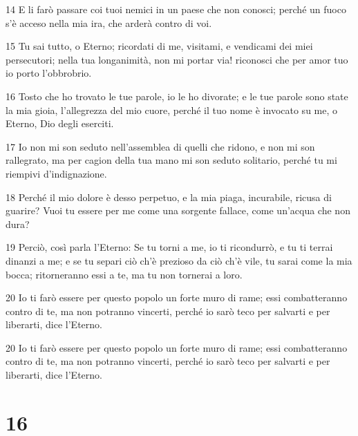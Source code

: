 \par 14 E li farò passare coi tuoi nemici in un paese che non conosci; perché un fuoco s'è acceso nella mia ira, che arderà contro di voi.
\par 15 Tu sai tutto, o Eterno; ricordati di me, visitami, e vendicami dei miei persecutori; nella tua longanimità, non mi portar via! riconosci che per amor tuo io porto l'obbrobrio.
\par 16 Tosto che ho trovato le tue parole, io le ho divorate; e le tue parole sono state la mia gioia, l'allegrezza del mio cuore, perché il tuo nome è invocato su me, o Eterno, Dio degli eserciti.
\par 17 Io non mi son seduto nell'assemblea di quelli che ridono, e non mi son rallegrato, ma per cagion della tua mano mi son seduto solitario, perché tu mi riempivi d'indignazione.
\par 18 Perché il mio dolore è desso perpetuo, e la mia piaga, incurabile, ricusa di guarire? Vuoi tu essere per me come una sorgente fallace, come un'acqua che non dura?
\par 19 Perciò, così parla l'Eterno: Se tu torni a me, io ti ricondurrò, e tu ti terrai dinanzi a me; e se tu separi ciò ch'è prezioso da ciò ch'è vile, tu sarai come la mia bocca; ritorneranno essi a te, ma tu non tornerai a loro.
\par 20 Io ti farò essere per questo popolo un forte muro di rame; essi combatteranno contro di te, ma non potranno vincerti, perché io sarò teco per salvarti e per liberarti, dice l'Eterno.
\par 20 Io ti farò essere per questo popolo un forte muro di rame; essi combatteranno contro di te, ma non potranno vincerti, perché io sarò teco per salvarti e per liberarti, dice l'Eterno.

\chapter{16}

